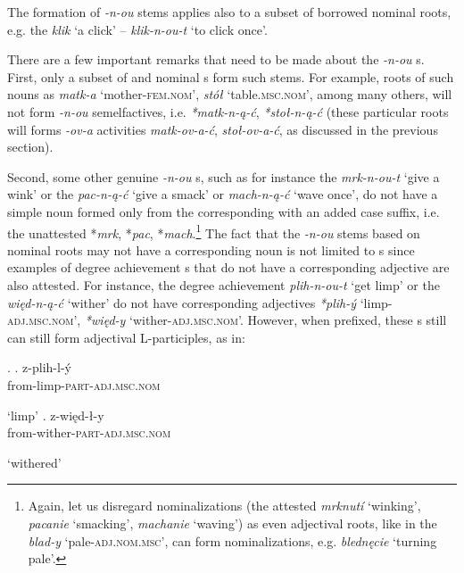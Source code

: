 The formation of   \textit{-n-ou} stems applies also to a subset of borrowed nominal roots, e.g. the   \textit{klik} `a click' -- \textit{klik-n-ou-t} `to click once'.
\par
There are a few important remarks that need to be made about the \textit{-n-ou} s. First, only a subset of  and  nominal s form such stems. For example, roots of such  nouns as \textit{matk-a} `mother-\textsc{fem.nom}', \textit{st\'o\l} `table.\textsc{msc.nom}', among many others, will not form \textit{-n-ou}  semelfactives, i.e. \textit{*matk-n-\k{a}-\'c}, \textit{*sto\l-n-\k{a}-\'c} (these particular roots will forms \textit{-ov-a} activities \textit{matk-ov-a-\'c}, \textit{sto\l-ov-a-\'c}, as discussed in the previous section).
\par
 Second, some other genuine \textit{-n-ou} s, such as for instance the  \textit{mrk-n-ou-t} `give a wink' or the  \textit{pac-n-\k{a}-\'c} `give a smack' or \textit{mach-n-\k{a}-\'c} `wave once', do not have a simple noun formed only from the corresponding  with an added case suffix, i.e. the unattested *\textit{mrk}, *\textit{pac}, *\textit{mach}.\footnote{Again, let us disregard nominalizations (the attested \textit{mrknut\'i} `winking', \textit{pacanie} `smacking', \textit{machanie} `waving') as even adjectival roots, like in the  \textit{blad-y} `pale-\textsc{adj.nom.msc}', can form nominalizations, e.g. \textit{bledn\k{e}cie} `turning pale'.
 } %
The fact that the \textit{-n-ou} stems based on nominal roots may not have a corresponding noun is not limited to s since examples of  degree achievement s that do not have a corresponding adjective are also attested. For instance, the  degree achievement  \textit{plih-n-ou-t} `get limp' or the  \textit{wi\k{e}d-n-\k{a}-\'c} `wither' do not have corresponding adjectives \textit{*plih-\'y} `limp-\textsc{adj.msc.nom}', \textit{*wi\k{e}d-y} `wither-\textsc{adj.msc.nom}'. However, when prefixed, these s still can still form adjectival L-participles, as in:

\ex.
\ag.  
z-plih-l-\'y\\
from-limp-\textsc{part}-\textsc{adj.msc.nom}\\
\strut `limp'
\bg.
z-wi\k{e}d-\l-y\\
from-wither-\textsc{part}-\textsc{adj.msc.nom}\\
\strut `withered'


